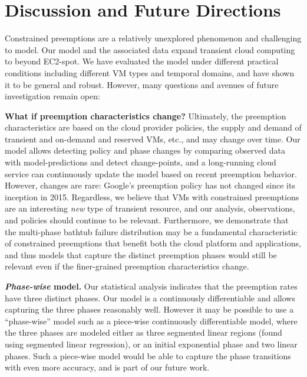 \section{Discussion and Future Directions}
\label{sec:discussion}


Constrained preemptions are a relatively unexplored phenomenon and challenging to model.
Our model and the associated data expand transient cloud computing to beyond EC2-spot.
We have evaluated the model under different practical conditions including different VM types and temporal domains, and have shown it to be general and robust. 
However, many questions and avenues of future investigation remain open:

\noindent \textbf{What if preemption characteristics change?}
Ultimately, the preemption characteristics are based on the cloud provider policies, the supply and demand of transient and on-demand and reserved VMs, etc., and may change over time. 
Our model allows detecting policy and phase changes by comparing observed data with model-predictions and detect change-points, and 
a long-running cloud service can continuously update the model based on recent preemption behavior. 
However, changes are rare: Google's preemption policy has not changed since its inception in 2015.
%
Regardless, we believe that VMs with constrained preemptions are an interesting \emph{new} type of transient resource, and our analysis, observations, and policies should continue to be relevant. 
Furthermore, we demonstrate that the multi-phase bathtub failure distribution may be a fundamental characteristic of constrained preemptions that benefit both the cloud platform and applications, and thus models that capture the distinct preemption phases would still be relevant even if the finer-grained preemption characteristics change. %
%


\noindent \textbf{\emph{Phase-wise} model.}
Our statistical analysis indicates that the preemption rates have three distinct phases. 
Our model is a continuously differentiable and allows capturing the three phases reasonably well. 
However it may be possible to use a ``phase-wise'' model such as a piece-wise continuously differentiable model, where the three phases are modeled either as three segmented linear regions (found using segmented linear regression), or an initial exponential phase and two linear phases. 
Such a piece-wise model would be able to capture the phase transitions with even more accuracy, and is part of our future work. 

